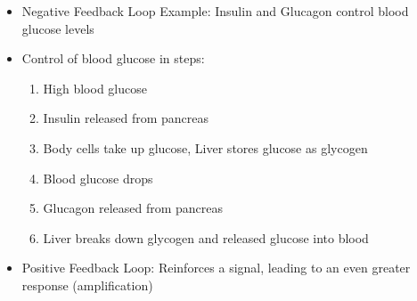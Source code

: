 \documentclass[12pt]{article}
\begin{document}
\begin{itemize}
  \item Negative Feedback Loop Example: Insulin and Glucagon control blood glucose levels

  \item Control of blood glucose in steps:

    \begin{enumerate}

      \item High blood glucose

      \item Insulin released from pancreas

      \item Body cells take up glucose, Liver stores glucose as glycogen

      \item Blood glucose drops

      \item Glucagon released from pancreas

      \item Liver breaks down glycogen and released glucose into blood

    \end{enumerate}

  \item Positive Feedback Loop: Reinforces a signal, leading to an even greater response (amplification)

\end{itemize}
\end{document}
